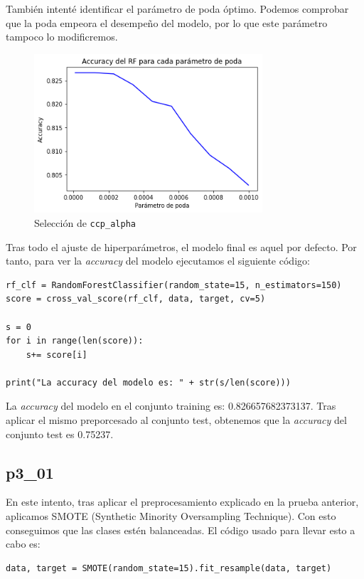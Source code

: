 \documentclass[a4]{article}
\begin{document}
También intenté identificar el parámetro de poda óptimo. Podemos comprobar que la poda empeora el desempeño del modelo, por lo que este parámetro tampoco lo modificremos.

\begin{figure}[H]
  \centering
  \caption{Selección de \texttt{ccp\_alpha}}
  \includegraphics[width=85mm]{imagenes/p3_00_ccp_alpha}
\end{figure}

Tras todo el ajuste de hiperparámetros, el modelo final es aquel por defecto. Por tanto, para ver la \textit{accuracy} del modelo ejecutamos el siguiente código:

\begin{lstlisting}
rf_clf = RandomForestClassifier(random_state=15, n_estimators=150)
score = cross_val_score(rf_clf, data, target, cv=5)

s = 0
for i in range(len(score)):
    s+= score[i]

print("La accuracy del modelo es: " + str(s/len(score)))
\end{lstlisting}

La \textit{accuracy} del modelo en el conjunto training es: 0.826657682373137. Tras aplicar el mismo preporcesado al conjunto test, obtenemos que la \textit{accuracy} del conjunto test es 0.75237. 

\subsection{p3\_01}

En este intento, tras aplicar el preprocesamiento explicado en la prueba anterior, aplicamos SMOTE (Synthetic Minority Oversampling Technique). Con esto conseguimos que las clases estén balanceadas. El código usado para llevar esto a cabo es:

\begin{lstlisting}
data, target = SMOTE(random_state=15).fit_resample(data, target)
\end{lstlisting}
\end{document}
